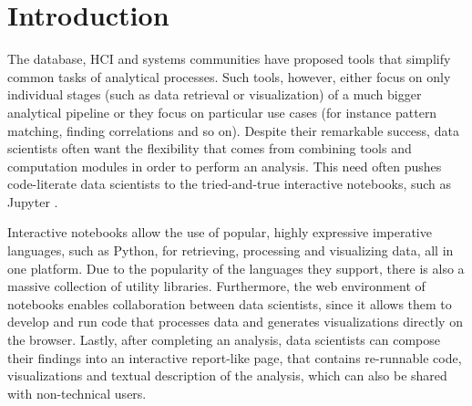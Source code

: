 \section{Introduction}
\label{section:introduction}




The database, HCI and systems communities have proposed tools that simplify common tasks of analytical processes. Such tools, however, either focus on only individual stages (such as data retrieval or visualization) of a much bigger analytical pipeline or they focus on particular use cases (for instance pattern matching, finding correlations and so on). Despite their remarkable success, data scientists often want the flexibility that comes from combining tools and computation modules in order to perform an analysis. This need often pushes code-literate data scientists to the tried-and-true interactive notebooks, such as Jupyter .

Interactive notebooks allow the use of popular, highly expressive imperative languages, such as Python, for retrieving, processing and visualizing data, all in one platform. Due to the popularity of the languages they support, there is also a massive collection of utility libraries. Furthermore, the web environment of notebooks enables collaboration between data scientists, since it allows them to develop and run code that processes data and generates visualizations directly on the browser. Lastly, after completing an analysis, data scientists can compose their findings into an interactive report-like page, that contains re-runnable code, visualizations and textual description of the analysis, which can also be shared with non-technical users.  



